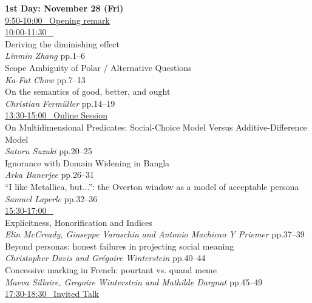 \documentclass[12pt]{ltjarticle}
\begin{document}
\newcommand{\slot}[2]{\noindent \underline{#1 \  #2} \\}
\newcommand{\talk}[3]{
  \noindent #2 \\ 
  \indent\indent \textit{#1} \dotfill #3 
  \smallskip \\
  }
\newcommand{\talkk}[3]{
  \noindent #2 \\ 
  \indent\indent \textit{#1}
  \smallskip \\
  }


\noindent\textbf{\large 
1st Day: November 28 (Fri)
}\\



\slot{9:50-10:00}{Opening remark}



\slot{10:00-11:30}{}

  
\talk{Linmin Zhang}
     {Deriving the diminishing effect}
     {pp.1--6}
  
\talk{Ka-Fat Chow}
     {Scope Ambiguity of Polar / Alternative Questions}
     {pp.7--13}
  
\talk{Christian Fermüller}
     {On the semantics of good, better, and ought}
     {pp.14--19}



\slot{13:30-15:00}{Online Session}

  
\talk{Satoru Suzuki}
     {On Multidimensional Predicates: Social-Choice Model Versus Additive-Difference Model}
     {pp.20--25}
  
\talk{Arka Banerjee}
     {Ignorance with Domain Widening in Bangla}
     {pp.26--31}
  
\talk{Samuel Laperle}
     {“I like Metallica, but...”: the Overton window as a model of acceptable persona}
     {pp.32--36}



\slot{15:30-17:00}{}
 
  
\talk{Elin McCready, Giuseppe Varaschin and Antonio Machicao Y Priemer}
     {Explicitness, Honorification and Indices}
     {pp.37--39}
  
\talk{Christopher Davis and Grégoire Winterstein}
     {Beyond personas: honest failures in projecting social meaning}
     {pp.40--44}
  
\talk{Maeva Sillaire, Gregoire Winterstein and Mathilde Dargnat}
     {Concessive marking in French: pourtant vs. quand meme}
     {pp.45--49}
 


\slot{17:30-18:30}{Invited Talk}
 
\end{document}
